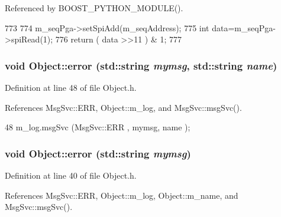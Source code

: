 Referenced by BOOST\_\-PYTHON\_\-MODULE().


\begin{DoxyCode}
773                              {
774   m_seqPga->setSpiAdd(m_seqAddress);
775   int data=m_seqPga->spiRead(1);
776   return ( data >>11 ) & 1;
777 }
\end{DoxyCode}
\hypertarget{classObject_ad7f6c457733082efa2f9ff5f5c8e119a}{
\subsubsection[{error}]{\setlength{\rightskip}{0pt plus 5cm}void Object::error (std::string {\em mymsg}, \/  std::string {\em name})}}
\label{classObject_ad7f6c457733082efa2f9ff5f5c8e119a}


Definition at line 48 of file Object.h.

References MsgSvc::ERR, Object::m\_\-log, and MsgSvc::msgSvc().


\begin{DoxyCode}
48 { m_log.msgSvc (MsgSvc::ERR     , mymsg, name ); }
\end{DoxyCode}
\hypertarget{classObject_a204a95f57818c0f811933917a30eff45}{
\subsubsection[{error}]{\setlength{\rightskip}{0pt plus 5cm}void Object::error (std::string {\em mymsg})}}
\label{classObject_a204a95f57818c0f811933917a30eff45}


Definition at line 40 of file Object.h.

References MsgSvc::ERR, Object::m\_\-log, Object::m\_\-name, and MsgSvc::msgSvc().

